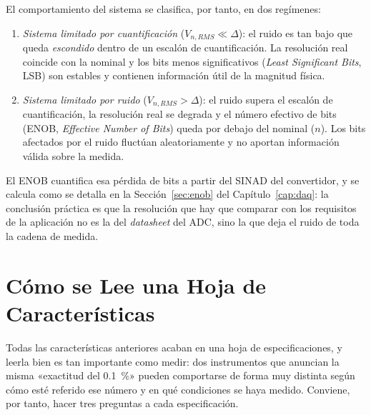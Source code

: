 El comportamiento del sistema se clasifica, por tanto, en dos regímenes:
\begin{enumerate}
    \item \emph{Sistema limitado por cuantificación} ($V_{n,RMS} \ll \Delta$): el ruido es tan bajo que queda \emph{escondido} dentro de un escalón de cuantificación. La resolución real coincide con la nominal y los bits menos significativos (\textit{Least Significant Bits}, LSB) son estables y contienen información útil de la magnitud física.
    \item \emph{Sistema limitado por ruido} ($V_{n,RMS} > \Delta$): el ruido supera el escalón de cuantificación, la resolución real se degrada y el número efectivo de bits (ENOB, \emph{Effective Number of Bits}) queda por debajo del nominal ($n$). Los bits afectados por el ruido fluctúan aleatoriamente y no aportan información válida sobre la medida.
\end{enumerate}

El ENOB cuantifica esa pérdida de bits a partir del SINAD del convertidor, y se calcula como se detalla en la Sección~\ref{sec:enob} del Capítulo~\ref{cap:daq}: la conclusión práctica es que la resolución que hay que comparar con los requisitos de la aplicación no es la del \textit{datasheet} del ADC, sino la que deja el ruido de toda la cadena de medida.

\section{Cómo se Lee una Hoja de Características}\label{sec:hoja_caracteristicas}

Todas las características anteriores acaban en una hoja de especificaciones, y leerla bien es tan importante como medir: dos instrumentos que anuncian la misma «exactitud del \SI{0.1}{\percent}» pueden comportarse de forma muy distinta según cómo esté referido ese número y en qué condiciones se haya medido. Conviene, por tanto, hacer tres preguntas a cada especificación.

